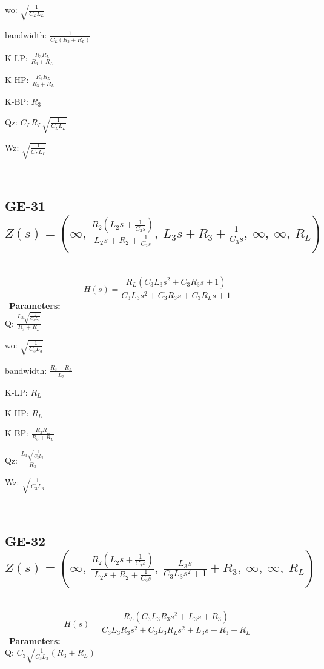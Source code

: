 \documentclass{article}
\begin{document}
wo: $\sqrt{\frac{1}{C_{L} L_{L}}}$\ 

bandwidth: $\frac{1}{C_{L} \left(R_{3} + R_{L}\right)}$\ 

K-LP: $\frac{R_{3} R_{L}}{R_{3} + R_{L}}$\ 

K-HP: $\frac{R_{3} R_{L}}{R_{3} + R_{L}}$\ 

K-BP: $R_{3}$\ 

Qz: $C_{L} R_{L} \sqrt{\frac{1}{C_{L} L_{L}}}$\ 

Wz: $\sqrt{\frac{1}{C_{L} L_{L}}}$\ 

\ 

\subsection{GE-31 $Z(s) = \left( \infty, \  \frac{R_{2} \left(L_{2} s + \frac{1}{C_{2} s}\right)}{L_{2} s + R_{2} + \frac{1}{C_{2} s}}, \  L_{3} s + R_{3} + \frac{1}{C_{3} s}, \  \infty, \  \infty, \  R_{L}\right)$ } \ 
\textbf{\[H(s) = \frac{R_{L} \left(C_{3} L_{3} s^{2} + C_{3} R_{3} s + 1\right)}{C_{3} L_{3} s^{2} + C_{3} R_{3} s + C_{3} R_{L} s + 1}\] } \ 
\textbf{Parameters:}\\ 

Q: $\frac{L_{3} \sqrt{\frac{1}{C_{3} L_{3}}}}{R_{3} + R_{L}}$\ 

wo: $\sqrt{\frac{1}{C_{3} L_{3}}}$\ 

bandwidth: $\frac{R_{3} + R_{L}}{L_{3}}$\ 

K-LP: $R_{L}$\ 

K-HP: $R_{L}$\ 

K-BP: $\frac{R_{3} R_{L}}{R_{3} + R_{L}}$\ 

Qz: $\frac{L_{3} \sqrt{\frac{1}{C_{3} L_{3}}}}{R_{3}}$\ 

Wz: $\sqrt{\frac{1}{C_{3} L_{3}}}$\ 

\ 

\subsection{GE-32 $Z(s) = \left( \infty, \  \frac{R_{2} \left(L_{2} s + \frac{1}{C_{2} s}\right)}{L_{2} s + R_{2} + \frac{1}{C_{2} s}}, \  \frac{L_{3} s}{C_{3} L_{3} s^{2} + 1} + R_{3}, \  \infty, \  \infty, \  R_{L}\right)$ } \ 
\textbf{\[H(s) = \frac{R_{L} \left(C_{3} L_{3} R_{3} s^{2} + L_{3} s + R_{3}\right)}{C_{3} L_{3} R_{3} s^{2} + C_{3} L_{3} R_{L} s^{2} + L_{3} s + R_{3} + R_{L}}\] } \ 
\textbf{Parameters:}\\ 

Q: $C_{3} \sqrt{\frac{1}{C_{3} L_{3}}} \left(R_{3} + R_{L}\right)$\ 
\end{document}

